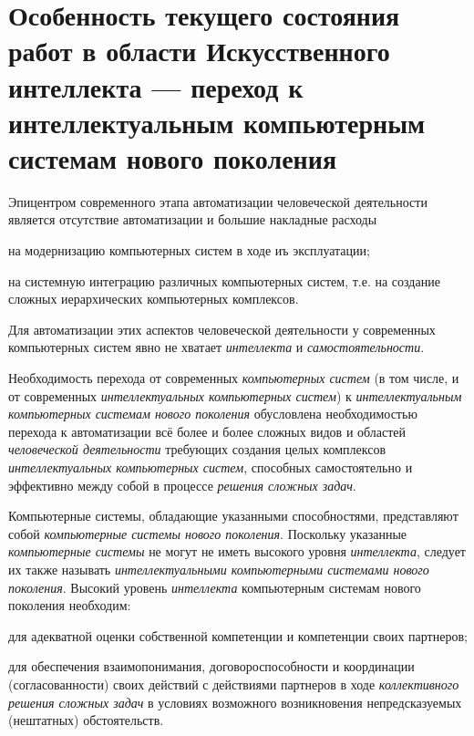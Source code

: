 \section*{Особенность текущего состояния работ в области Искусственного интеллекта --- переход к интеллектуальным компьютерным системам нового поколения}
\label{concl_feature_current_state_work_field_AI}

Эпицентром современного этапа автоматизации человеческой деятельности является отсутствие автоматизации и большие накладные расходы
\begin{textitemize}
	\item на модернизацию компьютерных систем в ходе иъ эксплуатации;
	\item на системную интеграцию различных компьютерных систем, т.е. на создание сложных иерархических компьютерных комплексов.
\end{textitemize}

Для автоматизации этих аспектов человеческой деятельности у современных компьютерных систем явно не хватает \textit{интеллекта} и \textit{самостоятельности}.

Необходимость перехода от современных \textit{компьютерных систем} (в том числе, и от современных \textit{интеллектуальных компьютерных систем}) к \textit{интеллектуальным компьютерных системам нового поколения} обусловлена необходимостью перехода к автоматизации всё более и более сложных видов и областей \textit{человеческой деятельности} требующих создания целых комплексов \textit{интеллектуальных компьютерных систем}, способных самостоятельно  и эффективно  между собой в процессе \textit{ решения сложных задач}.

Компьютерные системы, обладающие указанными способностями, представляют собой \textit{компьютерные системы нового поколения}. Поскольку указанные \textit{компьютерные системы} не могут не иметь высокого уровня \textit{интеллекта}, следует их также называть \textit{интеллектуальными компьютерными системами нового поколения}. Высокий уровень \textit{интеллекта} компьютерным системам нового поколения необходим:
\begin{textitemize}
	\item для адекватной оценки собственной компетенции и компетенции своих партнеров;
	\item для обеспечения взаимопонимания, договороспособности и координации (согласованности) своих действий с действиями партнеров в ходе \textit{коллективного решения сложных задач} в условиях возможного возникновения непредсказуемых (нештатных) обстоятельств.
\end{textitemize}

